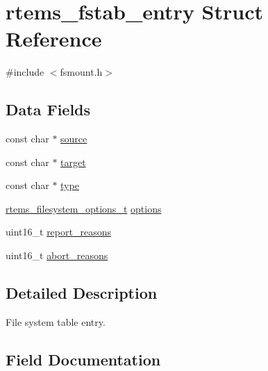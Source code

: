 \hypertarget{structrtems__fstab__entry}{}\section{rtems\+\_\+fstab\+\_\+entry Struct Reference}
\label{structrtems__fstab__entry}


{\ttfamily \#include $<$fsmount.\+h$>$}

\subsection*{Data Fields}
\begin{DoxyCompactItemize}
\item 
const char $\ast$ \mbox{\hyperlink{structrtems__fstab__entry_a399f942386cf428636ba749fc076dc8d}{source}}
\item 
const char $\ast$ \mbox{\hyperlink{structrtems__fstab__entry_a835ee3be89c0b487652f42b0b2fe37f5}{target}}
\item 
const char $\ast$ \mbox{\hyperlink{structrtems__fstab__entry_aa7820df05698d0bfd9804ff345ced66c}{type}}
\item 
\mbox{\hyperlink{group__FileSystemTypesAndMount_gabb3a23ee6b6e7aacb719a1a81716af7a}{rtems\+\_\+filesystem\+\_\+options\+\_\+t}} \mbox{\hyperlink{structrtems__fstab__entry_a2f2f6d2e80d9b535e668ae56ef8c386f}{options}}
\item 
uint16\+\_\+t \mbox{\hyperlink{structrtems__fstab__entry_ab3b5d5d525b7f5a3981b54a87e9172dd}{report\+\_\+reasons}}
\item 
uint16\+\_\+t \mbox{\hyperlink{structrtems__fstab__entry_ad8fc71b9cf29dc4385f36f26a2003dac}{abort\+\_\+reasons}}
\end{DoxyCompactItemize}


\subsection{Detailed Description}
File system table entry. 

\subsection{Field Documentation}
\mbox{\label{structrtems__fstab__entry_ad8fc71b9cf29dc4385f36f26a2003dac}} 
